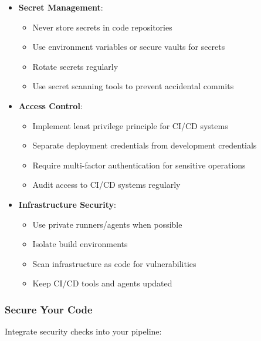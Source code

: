\begin{itemize}
    \item \textbf{Secret Management}:
    \begin{itemize}
        \item Never store secrets in code repositories
        \item Use environment variables or secure vaults for secrets
        \item Rotate secrets regularly
        \item Use secret scanning tools to prevent accidental commits
    \end{itemize}
    
    \item \textbf{Access Control}:
    \begin{itemize}
        \item Implement least privilege principle for CI/CD systems
        \item Separate deployment credentials from development credentials
        \item Require multi-factor authentication for sensitive operations
        \item Audit access to CI/CD systems regularly
    \end{itemize}
    
    \item \textbf{Infrastructure Security}:
    \begin{itemize}
        \item Use private runners/agents when possible
        \item Isolate build environments
        \item Scan infrastructure as code for vulnerabilities
        \item Keep CI/CD tools and agents updated
    \end{itemize}
\end{itemize}

\subsubsection{Secure Your Code}
Integrate security checks into your pipeline:

